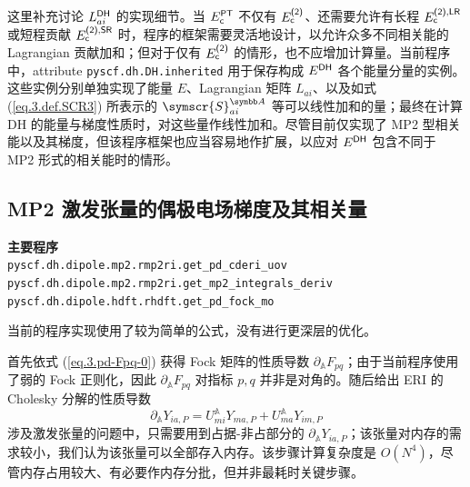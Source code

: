这里补充讨论 $L_{ai}^{\textsf{DH}}$ 的实现细节。当 $E_{\textsf{c}}^{\textsf{PT}}$ 不仅有 $E_{\textsf{c}}^{\textsf{(2)}}$、还需要允许有长程 $E_{\textsf{c}}^{\textsf{(2)}, \textsf{LR}}$ 或短程贡献 $E_{\textsf{c}}^{\textsf{(2)}, \textsf{SR}}$ 时，程序的框架需要灵活地设计，以允许众多不同相关能的 Lagrangian 贡献加和；但对于仅有 $E_{\textsf{c}}^{\textsf{(2)}}$ 的情形，也不应增加计算量。当前程序中，attribute \verb|pyscf.dh.DH.inherited| 用于保存构成 $E^{\textsf{DH}}$ 各个能量分量的实例。这些实例分别单独实现了能量 $E$、Lagrangian 矩阵 $L_{ai}$、以及如式 (\ref{eq.3.def.SCR3}) 所表示的 $\symscr{S}_{ai}^\mathbb{A}$ 等可以线性加和的量；最终在计算 DH 的能量与梯度性质时，对这些量作线性加和。尽管目前仅实现了 MP2 型相关能以及其梯度，但该程序框架也应当容易地作扩展，以应对 $E^{\textsf{DH}}$ 包含不同于 MP2 形式的相关能时的情形。

\subsection{MP2 激发张量的偶极电场梯度及其相关量}

\begin{tcolorbox}
    \textbf{主要程序}\\
    \verb|pyscf.dh.dipole.mp2.rmp2ri.get_pd_cderi_uov|\\
    \verb|pyscf.dh.dipole.mp2.rmp2ri.get_mp2_integrals_deriv|\\
    \verb|pyscf.dh.dipole.hdft.rhdft.get_pd_fock_mo|
\end{tcolorbox}

当前的程序实现使用了较为简单的公式，没有进行更深层的优化。

首先依式 (\ref{eq.3.pd-Fpq-0}) 获得 Fock 矩阵的性质导数 $\partial_\mathbb{A} F_{pq}$；由于当前程序使用了弱的 Fock 正则化，因此 $\partial_\mathbb{A} F_{pq}$ 对指标 $p, q$ 并非是对角的。随后给出 ERI 的 Cholesky 分解的性质导数
\begin{equation}
    \partial_\mathbb{A} Y_{ia, P} = U_{mi}^\mathbb{A} Y_{ma, P} + U_{ma}^\mathbb{A} Y_{im, P}
\end{equation}
涉及激发张量的问题中，只需要用到占据-非占部分的 $\partial_\mathbb{A} Y_{ia, P}$；该张量对内存的需求较小，我们认为该张量可以全部存入内存。该步骤计算复杂度是 $O(N^4)$，尽管内存占用较大、有必要作内存分批，但并非最耗时关键步骤。

